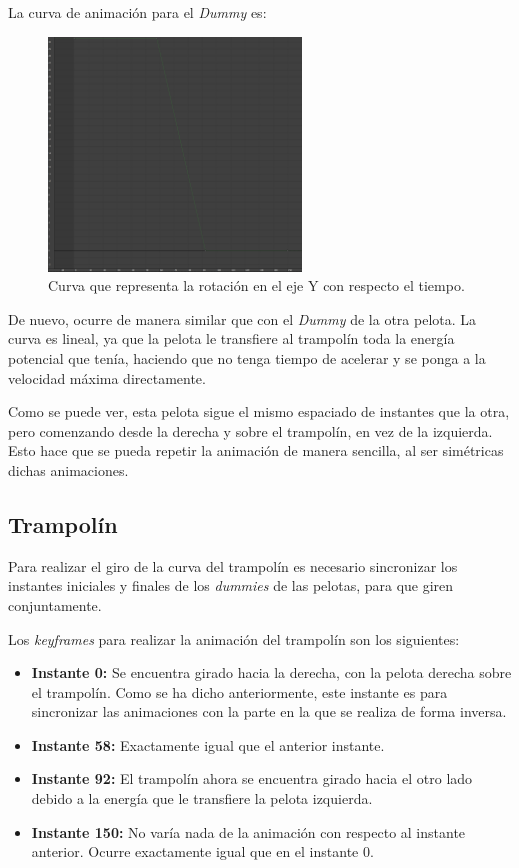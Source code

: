 \documentclass{article}
\begin{document}
La curva de animación para el \textit{Dummy} es:

\begin{figure}[H]
    \centering
    \includegraphics[width=0.6\textwidth]{imagenes/curvas/PR/dummy/green.png}
    \caption{Curva que representa la rotación en el eje Y con respecto el tiempo.}
 \end{figure}

De nuevo, ocurre de manera similar que con el \textit{Dummy} de la otra pelota. La curva es lineal, ya que la pelota le transfiere al trampolín toda la energía potencial que tenía, haciendo que no tenga tiempo de acelerar y se ponga a la velocidad máxima directamente.
 
Como se puede ver, esta pelota sigue el mismo espaciado de instantes que la otra, pero comenzando desde la derecha y sobre el trampolín, en vez de la izquierda. Esto hace que se pueda repetir la animación de manera sencilla, al ser simétricas dichas animaciones.
\subsection{Trampolín}
Para realizar el giro de la curva del trampolín es necesario sincronizar los instantes iniciales y finales de los \textit{dummies} de las pelotas, para que giren conjuntamente.

\bigskip

Los \textit{keyframes} para realizar la animación del trampolín son los siguientes:

\begin{itemize}
    \item \textbf{Instante 0: }Se encuentra girado hacia la derecha, con la pelota derecha sobre el trampolín. Como se ha dicho anteriormente, este instante es para sincronizar las animaciones con la parte en la que se realiza de forma inversa.
    \item \textbf{Instante 58: }Exactamente igual que el anterior instante.
    \item \textbf{Instante 92: }El trampolín ahora se encuentra girado hacia el otro lado debido a la energía que le transfiere la pelota izquierda.
    \item \textbf{Instante 150: }No varía nada de la animación con respecto al instante anterior. Ocurre exactamente igual que en el instante 0.
\end{itemize}
\end{document}
